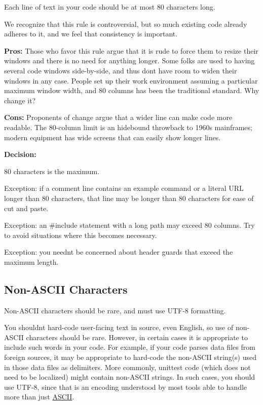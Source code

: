 Each line of text in your code should be at most 80 characters long.

We recognize that this rule is controversial, but so much existing code already adheres to it, and we feel that consistency is important.

{\bfseries Pros\+:} Those who favor this rule argue that it is rude to force them to resize their windows and there is no need for anything longer. Some folks are used to having several code windows side-\/by-\/side, and thus don\textquotesingle{}t have room to widen their windows in any case. People set up their work environment assuming a particular maximum window width, and 80 columns has been the traditional standard. Why change it?

{\bfseries Cons\+:} Proponents of change argue that a wider line can make code more readable. The 80-\/column limit is an hidebound throwback to 1960s mainframes; modern equipment has wide screens that can easily show longer lines.

{\bfseries Decision\+:}

80 characters is the maximum.

Exception\+: if a comment line contains an example command or a literal U\+RL longer than 80 characters, that line may be longer than 80 characters for ease of cut and paste.

Exception\+: an \#include statement with a long path may exceed 80 columns. Try to avoid situations where this becomes necessary.

Exception\+: you needn\textquotesingle{}t be concerned about header guards that exceed the maximum length.

\subsection*{Non-\/\+A\+S\+C\+II Characters}

Non-\/\+A\+S\+C\+II characters should be rare, and must use U\+T\+F-\/8 formatting.

You shouldn\textquotesingle{}t hard-\/code user-\/facing text in source, even English, so use of non-\/\+A\+S\+C\+II characters should be rare. However, in certain cases it is appropriate to include such words in your code. For example, if your code parses data files from foreign sources, it may be appropriate to hard-\/code the non-\/\+A\+S\+C\+II string(s) used in those data files as delimiters. More commonly, unittest code (which does not need to be localized) might contain non-\/\+A\+S\+C\+II strings. In such cases, you should use U\+T\+F-\/8, since that is an encoding understood by most tools able to handle more than just \hyperlink{structASCII}{A\+S\+C\+II}.

